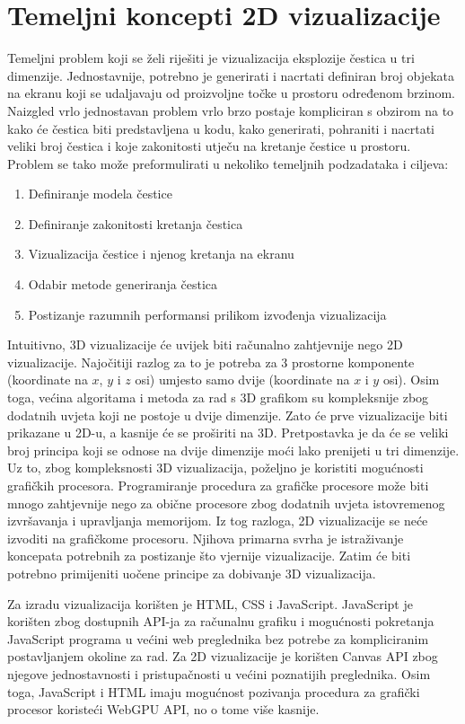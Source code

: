 \documentclass{foi}
\begin{document}
\chapter{Temeljni koncepti 2D vizualizacije}

Temeljni problem koji se želi riješiti je vizualizacija eksplozije čestica u tri dimenzije. Jednostavnije, potrebno je generirati i nacrtati definiran broj objekata na ekranu koji se udaljavaju od proizvoljne točke u prostoru određenom brzinom. Naizgled vrlo jednostavan problem vrlo brzo postaje kompliciran s obzirom na to kako će čestica biti predstavljena u kodu, kako generirati, pohraniti i nacrtati veliki broj čestica i koje zakonitosti utječu na kretanje čestice u prostoru. Problem se tako može preformulirati u nekoliko temeljnih podzadataka i ciljeva:

\begin{enumerate}
  \item Definiranje modela čestice  
  \item Definiranje zakonitosti kretanja čestica
  \item Vizualizacija čestice i njenog kretanja na ekranu
  \item Odabir metode generiranja čestica
  \item Postizanje razumnih performansi prilikom izvođenja vizualizacija
\end{enumerate}

Intuitivno, 3D vizualizacije će uvijek biti računalno zahtjevnije nego 2D vizualizacije. Najočitiji razlog za to je potreba za 3 prostorne komponente (koordinate na $x$, $y$ i $z$ osi) umjesto samo dvije (koordinate na $x$ i $y$ osi). Osim toga, većina algoritama i metoda za rad s 3D grafikom su kompleksnije zbog dodatnih uvjeta koji ne postoje u dvije dimenzije. Zato će prve vizualizacije biti prikazane u 2D-u, a kasnije će se proširiti na 3D. Pretpostavka je da će se veliki broj principa koji se odnose na dvije dimenzije moći lako prenijeti u tri dimenzije. Uz to, zbog kompleksnosti 3D vizualizacija, poželjno je koristiti mogućnosti grafičkih procesora. Programiranje procedura za grafičke procesore može biti mnogo zahtjevnije nego za obične procesore zbog dodatnih uvjeta istovremenog izvršavanja i upravljanja memorijom. Iz tog razloga, 2D vizualizacije se neće izvoditi na grafičkome procesoru. Njihova primarna svrha je istraživanje koncepata potrebnih za postizanje što vjernije vizualizacije. Zatim će biti potrebno primijeniti uočene principe za dobivanje 3D vizualizacija. 

Za izradu vizualizacija korišten je HTML, CSS i JavaScript. JavaScript je korišten zbog dostupnih API-ja za računalnu grafiku i mogućnosti pokretanja JavaScript programa u većini web preglednika bez potrebe za kompliciranim postavljanjem okoline za rad. Za 2D vizualizacije je korišten Canvas API zbog njegove jednostavnosti i pristupačnosti u većini poznatijih preglednika. Osim toga, JavaScript i HTML imaju mogućnost pozivanja procedura za grafički procesor koristeći WebGPU API, no o tome više kasnije. 
\end{document}
